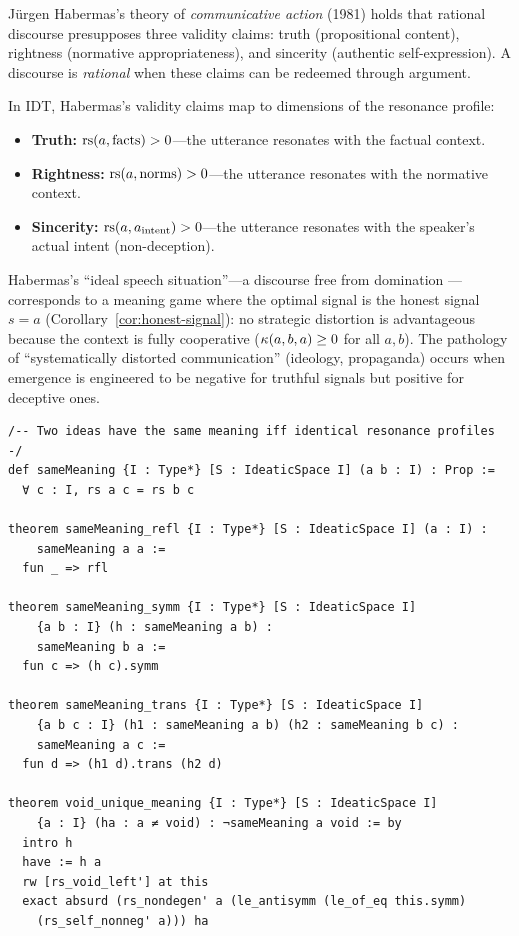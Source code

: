\begin{interpretation}
J\"urgen Habermas's theory of \emph{communicative action} (1981) holds
that rational discourse presupposes three validity claims: truth
(propositional content), rightness (normative appropriateness), and
sincerity (authentic self-expression). A discourse is \emph{rational}
when these claims can be redeemed through argument.

In IDT, Habermas's validity claims map to dimensions of the resonance
profile:
\begin{itemize}
\item \textbf{Truth:} $\mathrm{rs}(a, \text{facts}) > 0$---the utterance resonates
with the factual context.
\item \textbf{Rightness:} $\mathrm{rs}(a, \text{norms}) > 0$---the utterance
resonates with the normative context.
\item \textbf{Sincerity:} $\mathrm{rs}(a, a_{\text{intent}}) > 0$---the utterance
resonates with the speaker's actual intent (non-deception).
\end{itemize}
Habermas's ``ideal speech situation''---a discourse free from domination
---corresponds to a meaning game where the optimal signal is the honest
signal $s = a$ (Corollary~\ref{cor:honest-signal}): no strategic
distortion is advantageous because the context is fully cooperative
($\kappa(a, b, a) \geq 0$ for all $a, b$). The pathology of
``systematically distorted communication'' (ideology, propaganda) occurs
when emergence is engineered to be negative for truthful signals but
positive for deceptive ones.
\end{interpretation}

\begin{lstlisting}[caption={Lean 4: Meaning-is-use equivalence}]
/-- Two ideas have the same meaning iff identical resonance profiles -/
def sameMeaning {I : Type*} [S : IdeaticSpace I] (a b : I) : Prop :=
  ∀ c : I, rs a c = rs b c

theorem sameMeaning_refl {I : Type*} [S : IdeaticSpace I] (a : I) :
    sameMeaning a a :=
  fun _ => rfl

theorem sameMeaning_symm {I : Type*} [S : IdeaticSpace I]
    {a b : I} (h : sameMeaning a b) :
    sameMeaning b a :=
  fun c => (h c).symm

theorem sameMeaning_trans {I : Type*} [S : IdeaticSpace I]
    {a b c : I} (h1 : sameMeaning a b) (h2 : sameMeaning b c) :
    sameMeaning a c :=
  fun d => (h1 d).trans (h2 d)

theorem void_unique_meaning {I : Type*} [S : IdeaticSpace I]
    {a : I} (ha : a ≠ void) : ¬sameMeaning a void := by
  intro h
  have := h a
  rw [rs_void_left'] at this
  exact absurd (rs_nondegen' a (le_antisymm (le_of_eq this.symm)
    (rs_self_nonneg' a))) ha
\end{lstlisting}


